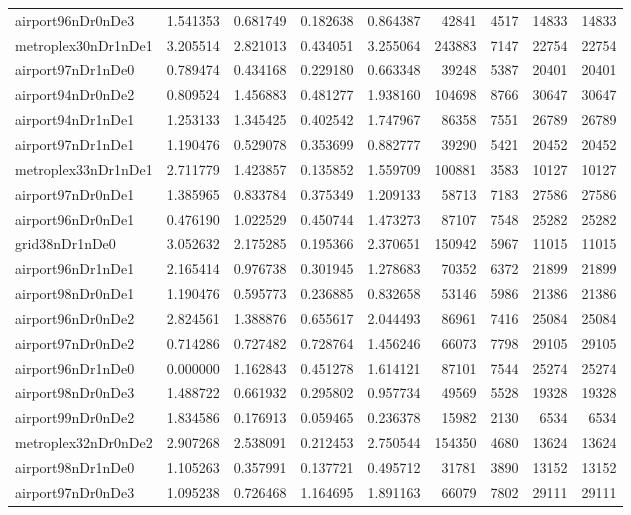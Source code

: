 \begin{longtable}{|l|r|r|r|r|r|r|r|r|}
airport96nDr0nDe3 & 1.541353 & 0.681749 & 0.182638 & 0.864387 & 42841 & 4517 & 14833 & 14833 \\
metroplex30nDr1nDe1 & 3.205514 & 2.821013 & 0.434051 & 3.255064 & 243883 & 7147 & 22754 & 22754 \\
airport97nDr1nDe0 & 0.789474 & 0.434168 & 0.229180 & 0.663348 & 39248 & 5387 & 20401 & 20401 \\
airport94nDr0nDe2 & 0.809524 & 1.456883 & 0.481277 & 1.938160 & 104698 & 8766 & 30647 & 30647 \\
airport94nDr1nDe1 & 1.253133 & 1.345425 & 0.402542 & 1.747967 & 86358 & 7551 & 26789 & 26789 \\
airport97nDr1nDe1 & 1.190476 & 0.529078 & 0.353699 & 0.882777 & 39290 & 5421 & 20452 & 20452 \\
metroplex33nDr1nDe1 & 2.711779 & 1.423857 & 0.135852 & 1.559709 & 100881 & 3583 & 10127 & 10127 \\
airport97nDr0nDe1 & 1.385965 & 0.833784 & 0.375349 & 1.209133 & 58713 & 7183 & 27586 & 27586 \\
airport96nDr0nDe1 & 0.476190 & 1.022529 & 0.450744 & 1.473273 & 87107 & 7548 & 25282 & 25282 \\
grid38nDr1nDe0 & 3.052632 & 2.175285 & 0.195366 & 2.370651 & 150942 & 5967 & 11015 & 11015 \\
airport96nDr1nDe1 & 2.165414 & 0.976738 & 0.301945 & 1.278683 & 70352 & 6372 & 21899 & 21899 \\
airport98nDr0nDe1 & 1.190476 & 0.595773 & 0.236885 & 0.832658 & 53146 & 5986 & 21386 & 21386 \\
airport96nDr0nDe2 & 2.824561 & 1.388876 & 0.655617 & 2.044493 & 86961 & 7416 & 25084 & 25084 \\
airport97nDr0nDe2 & 0.714286 & 0.727482 & 0.728764 & 1.456246 & 66073 & 7798 & 29105 & 29105 \\
airport96nDr1nDe0 & 0.000000 & 1.162843 & 0.451278 & 1.614121 & 87101 & 7544 & 25274 & 25274 \\
airport98nDr0nDe3 & 1.488722 & 0.661932 & 0.295802 & 0.957734 & 49569 & 5528 & 19328 & 19328 \\
airport99nDr0nDe2 & 1.834586 & 0.176913 & 0.059465 & 0.236378 & 15982 & 2130 & 6534 & 6534 \\
metroplex32nDr0nDe2 & 2.907268 & 2.538091 & 0.212453 & 2.750544 & 154350 & 4680 & 13624 & 13624 \\
airport98nDr1nDe0 & 1.105263 & 0.357991 & 0.137721 & 0.495712 & 31781 & 3890 & 13152 & 13152 \\
airport97nDr0nDe3 & 1.095238 & 0.726468 & 1.164695 & 1.891163 & 66079 & 7802 & 29111 & 29111 \\

\end{longtable}
